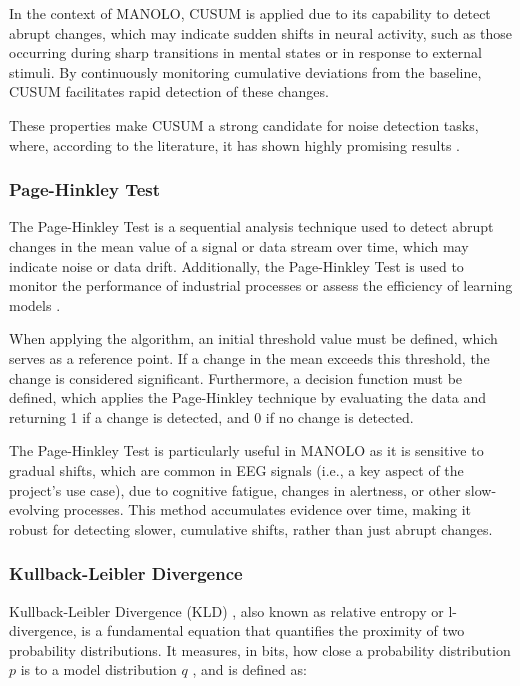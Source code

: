 In the context of MANOLO, CUSUM is applied due to its capability to detect abrupt changes, which may indicate sudden shifts in neural activity, such as those occurring during sharp transitions in mental states or in response to external stimuli. By continuously monitoring cumulative deviations from the baseline, CUSUM facilitates rapid detection of these changes.

These properties make CUSUM a strong candidate for noise detection tasks, where, according to the literature, it has shown highly promising results \cite{artyushenko2021modeling}\cite{volovach2021detection}\cite{tam2009theoretical}\cite{yi2021adaptive}.

\subsubsection{Page-Hinkley Test}
The Page-Hinkley Test is a sequential analysis technique used to detect abrupt changes \cite{sebastiao2017supporting} in the mean value of a signal or data stream over time, which may indicate noise or data drift. Additionally, the Page-Hinkley Test is used to monitor the performance of industrial processes \cite{mouss2004test} or assess the efficiency of learning models \cite{ali2023understanding}.

When applying the algorithm, an initial threshold value must be defined, which serves as a reference point. If a change in the mean exceeds this threshold, the change is considered significant. Furthermore, a decision function must be defined, which applies the Page-Hinkley technique by evaluating the data and returning 1 if a change is detected, and 0 if no change is detected.

The Page-Hinkley Test is particularly useful in MANOLO as it is sensitive to gradual shifts, which are common in EEG signals (i.e., a key aspect of the project's use case), due to cognitive fatigue, changes in alertness, or other slow-evolving processes. This method accumulates evidence over time, making it robust for detecting slower, cumulative shifts, rather than just abrupt changes.

\subsubsection{Kullback-Leibler Divergence}

Kullback-Leibler Divergence (KLD) \cite{joyce2011kullback}, also known as relative entropy or l-divergence, is a fundamental equation that quantifies the proximity of two probability distributions. It measures, in bits, how close a probability distribution \( p \) is to a model distribution \( q \) \cite{shlens2014notes}\cite{vanerven2014renyi}, and is defined as:

